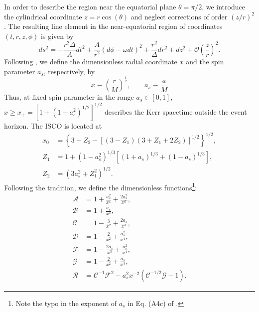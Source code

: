 \documentclass[a4paper,fleqn,usenatbib]{mnrasMOD}
\numberwithin{equation}{section}
\newcommand{\be}{\begin{equation}}
\newcommand{\ee}{\end{equation}}
\begin{document}
In order to describe the region near the equatorial plane $\theta = \pi / 2$, we introduce the cylindrical coordinate $z = r \cos(\theta)$ and neglect corrections of order $(z/r)^2$. The resulting line element in the near-equatorial region of coordinates $(t, r, z, \phi)$ is given by
\be \label{Kerr NE}
ds^2 = -\frac{r^2 \Delta}{A}dt^2 + \frac{A}{r^2}(d\phi - \omega dt)^2 + \frac{r^2}{\Delta}dr^2 + dz^2 + \mathcal{O}\left(\frac{z}{r}\right)^2.
\ee
Following \cite{25334}, we define the dimensionless radial coordinate $x$ and the spin parameter $a_s$, respectively, by
\be \label{dimless}
x \equiv \left(\frac{r}{M}\right)^{\frac{1}{2}}, \qquad a_s \equiv \frac{a}{M}
\ee
Thus, at fixed spin parameter in the range $a_{s} \in [0,1]$, $x \geq x_{+} =\left[1+ (1-a_s^2)^{1/2}\right]^{1/2}$ describes the Kerr spacetime outside the event horizon.
The ISCO is located at
\begin{subequations} \label{ISCO}
\begin{align}
x_0 &= \left\{3 + Z_2 -\left[(3-Z_1)(3+Z_1+2Z_2)\right]^{1/2}   \right\}^{1/2},\\
Z_1 &=1 + \left(1-a_s^2\right)^{1/3}\left[\left(1+a_s\right)^{1/3}+\left(1-a_s\right)^{1/3}\right],\\
Z_2 &= \left(3a_s^2+Z_1^2\right)^{1/2}.
\end{align}
\end{subequations}
Following the tradition, we define the dimensionless functions\footnote{Note the typo in the exponent of $a_s$ in Eq. (A4c) of \cite{Penna:2011rw}.}:
\begin{subequations} \label{AtoG}
\begin{align} 
\mathcal{A} &= 1+\frac{a_s^2}{x^4} +\frac{2a_s^2}{x^6}, \\
\mathcal{B} &= 1+ \frac{a_s}{x^3},\\
\mathcal{C} &= 1-\frac{3}{x^2}+\frac{2a_s}{x^3},\\
\mathcal{D} &= 1-\frac{2}{x^2}+\frac{a_s^2}{x^4},\\
\mathcal{F} &= 1-\frac{2a_s}{x^3}+\frac{a_s^2}{x^4},\\
\mathcal{G} &= 1-\frac{2}{x^2}+\frac{a_s}{x^3},\\
\mathcal{R} &= \mathcal{C}^{-1}\mathcal{F}^2 - a_s^2 x^{-2}\left(\mathcal{C}^{-1/2}\mathcal{G}-1\right).
\end{align}
\end{subequations}
\end{document}
